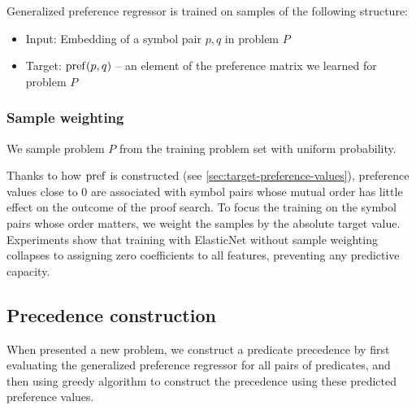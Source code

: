 Generalized preference regressor is trained on samples of the following structure:

\begin{itemize}
	\item Input: Embedding of a symbol pair \(p, q\) in problem \(P\)
	\item Target: \(\operatorname{pref}(p, q)\) -- an element of the preference matrix we learned for problem \(P\)
\end{itemize}

\subsubsection{Sample weighting}

We sample problem \(P\) from the training problem set with uniform probability.

Thanks to how \(\operatorname{pref}\) is constructed (see \autoref{sec:target-preference-values}),
preference values close to 0 are associated with symbol pairs whose mutual order has little effect
on the outcome of the proof search.
To focus the training on the symbol pairs whose order matters,
we weight the samples by the absolute target value.
Experiments show that training with ElasticNet without sample weighting
collapses to assigning zero coefficients to all features,
preventing any predictive capacity.



\subsection{Precedence construction}

When presented a new problem, we construct a predicate precedence by
first evaluating the generalized preference regressor for all pairs of predicates,
and then using greedy algorithm to construct the precedence using these predicted preference values.

